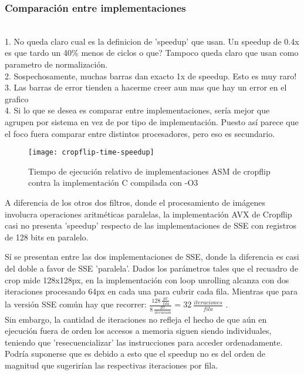 \subsubsection{Comparación entre implementaciones}

\cuidado \\
1. No queda claro cual es la definicion de 'speedup' que usan. Un speedup de 0.4x es que tardo un 40\% menos de ciclos o que? Tampoco queda claro que usan como parametro de normalización. \\
2. Sospechosamente, muchas barras dan exacto 1x de speedup. Esto es muy raro! \\
3. Las  barras de error tienden a hacerme creer aun mas que hay un error en el grafico \\
4. Si lo que se desea es comparar entre implementaciones, sería mejor que agrupen por sistema en vez de por tipo de implementación. Puesto así parece que el foco fuera comparar entre distintos procesadores, pero eso es secundario. \\
\cuidado

\begin{figure}[h]
\centering
\texttt{[image: cropflip-time-speedup]} 
\caption{Tiempo de ejecución relativo de implementaciones ASM de cropflip contra la implementación C compilada con -O3}
\label{fig:cropflip-time-speedup}
\end{figure}

A diferencia de los otros dos filtros, donde el procesamiento de imágenes involucra operaciones aritméticas paralelas, la implementación AVX de Cropflip casi no presenta 'speedup' respecto de las implementaciones de SSE con registros de 128 bits en paralelo.

Sí se presentan entre las dos implementaciones de SSE, donde la diferencia es casi del doble a favor de SSE 'paralela'. Dados los parámetros tales que el recuadro de crop mide 128x128px, en la implementación con loop unrolling alcanza con dos iteraciones procesando 64px en cada una para cubrir cada fila. Mientras que para la versión SSE común hay que recorrer: $\frac{128 \ \frac{px}{fila}}{8 \ \frac{px}{iteracion}} = 32 \ \frac{iteraciones}{fila}$ .
\\

Sin embargo, la cantidad de iteraciones no refleja el hecho de que aún en ejecución fuera de orden los accesos a memoria siguen siendo individuales, teniendo que 'resecuencializar' las instrucciones para acceder ordenadamente. Podría suponerse que es debido a esto que el speedup no es del orden de magnitud que sugerirían las respectivas iteraciones por fila.

